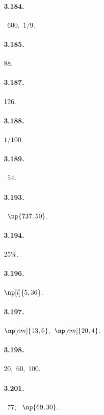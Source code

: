 \begin{multicols}{2}
\paragraph{3.184.} \officialeuro~$600$,~$1/9$.

\paragraph{3.185.} 88.

\paragraph{3.187.} 126.

\paragraph{3.188.} $1/100$.

\paragraph{3.189.} \officialeuro~$54$.

\paragraph{3.193.} \officialeuro~$\np{737,50}$.

\paragraph{3.194.} 25\%.

\paragraph{3.196.} $\np[l]{5,36}$.

\paragraph{3.197.} $\np[cm]{13,6}$,~$\np[cm]{20,4}$.

\paragraph{3.198.} 20{\textdegree},~60{\textdegree},~100{\textdegree}.

\paragraph{3.201.} \officialeuro~$77$; \officialeuro~$\np{69,30}$.


\end{multicols}
